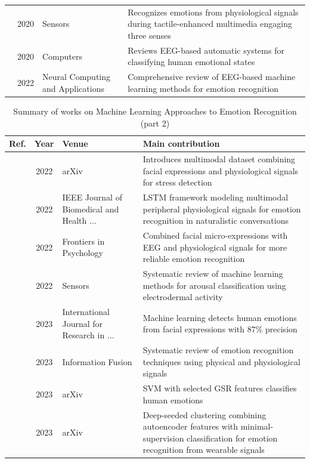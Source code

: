 \begin{table}[!t]
\begin{tabularx}{\textwidth}{@{}l c p{3.6cm} X@{}}
\cite{raheel2020physiological} & 2020 & Sensors & Recognizes emotions from physiological signals during tactile-enhanced multimedia engaging three senses \\
\cite{alhalaseh2020machine} & 2020 & Computers & Reviews EEG-based automatic systems for classifying human emotional states \\
\cite{houssein2022human} & 2022 & Neural Computing and Applications & Comprehensive review of EEG-based machine learning methods for emotion recognition \\
\bottomrule
\end{tabularx}
\end{table}

\begin{table}[!t]
\centering
\renewcommand{\arraystretch}{1.2}
\caption{Summary of works on Machine Learning Approaches to Emotion Recognition (part 2)}
\begin{tabularx}{\textwidth}{@{}l c p{3.6cm} X@{}}
\toprule
\textbf{Ref.} & \textbf{Year} & \textbf{Venue} & \textbf{Main contribution} \\
\midrule
\cite{hosseini2022multimodal} & 2022 & arXiv & Introduces multimodal dataset combining facial expressions and physiological signals for stress detection \\
\cite{zitouni2022lstm} & 2022 & IEEE Journal of Biomedical and Health ... & LSTM framework modeling multimodal peripheral physiological signals for emotion recognition in naturalistic conversations \\
\cite{saffaryazdi2022facial} & 2022 & Frontiers in Psychology & Combined facial micro-expressions with EEG and physiological signals for more reliable emotion recognition \\
\cite{sanchezreolid2022machine} & 2022 & Sensors & Systematic review of machine learning methods for arousal classification using electrodermal activity \\
\cite{sharma2023emotion} & 2023 & International Journal for Research in ... & Machine learning detects human emotions from facial expressions with 87\% precision \\
\cite{khare2023emotion} & 2023 & Information Fusion & Systematic review of emotion recognition techniques using physical and physiological signals \\
\cite{fan2023human} & 2023 & arXiv & SVM with selected GSR features classifies human emotions \\
\cite{a2023deep} & 2023 & arXiv & Deep-seeded clustering combining autoencoder features with minimal-supervision classification for emotion recognition from wearable signals \\

\end{tabularx}
\end{table}
